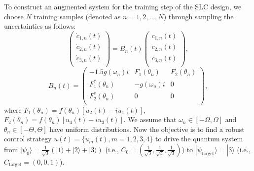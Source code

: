 \documentclass[letterpaper, 10 pt, conference]{ieeeconf}
\begin{document}
To construct an augmented system for the training step of the
SLC design, we choose $N$ training samples
(denoted as $n=1, 2, \ldots, N$) through sampling the uncertainties as follows:
\begin{equation}\label{3level-element1}
\left(\begin{array}{c}
  \dot{c}_{1,n}(t) \\
  \dot{c}_{2,n}(t) \\
  \dot{c}_{3,n}(t) \\
\end{array}\right)=B_{n}(t)\left(\begin{array}{c}
  c_{1,n}(t) \\
  c_{2,n}(t) \\
  c_{3,n}(t) \\
\end{array}\right),\end{equation}
\begin{equation}B_{n}(t)=
\left(\begin{array}{ccc}
  -1.5g(\omega_{n}) i & F_{1}(\theta_{n}) & F_{2}(\theta_{n}) \\
  F^{*}_{1}(\theta_{n}) & -g(\omega_{n}) i  & 0 \\
  F^{*}_{2}(\theta_{n}) & 0 & 0 \\
\end{array}\right)\nonumber,
\end{equation}
where $F_{1}(\theta_{n})=f(\theta_{n})[u_{2}(t)-iu_{1}(t)]$, $F_{2}(\theta_{n})=f(\theta_{n})[u_{4}(t)-iu_{3}(t)]$. We assume that $\omega_{n} \in [-\Omega, \Omega]$ and $\theta_{n} \in
[-\Theta, \Theta]$ have uniform distributions. Now the
objective is to find a robust control strategy $u(t)=\{u_{m}(t), m=1,2,
3,4\}$ to drive the quantum system from
$|\psi_{0}\rangle=\frac{1}{\sqrt{3}}(|1\rangle+|2\rangle+|3\rangle)$
(i.e.,
$C_{0}=(\frac{1}{\sqrt{3}},\frac{1}{\sqrt{3}},\frac{1}{\sqrt{3}})$)
to $|\psi_{\text{target}}\rangle=|3\rangle$ (i.e., $C_{\text{target}}=(0,0,1)$).
\end{document}
